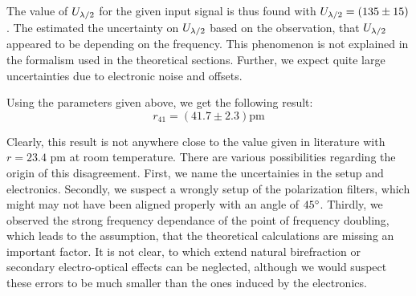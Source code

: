 The value of $U_{\lambda/2}$ for the given input signal is thus 
found with $U_{\lambda/2} = (135  \pm 15)$. 
The estimated the uncertainty on $U_{\lambda/2}$ based on the 
observation, that $U_{\lambda/2}$ appeared to be 
depending on the frequency. This phenomenon is not 
explained in the formalism used in the theoretical sections. 
Further, we expect quite large uncertainties due to 
electronic noise and offsets. 

Using the parameters given above, we get the following result: 
\begin{equation*}
r_{41} = \left (41.7 \pm 2.3 \right )  \mathrm{pm}
\end{equation*}

Clearly, this result is not anywhere close to the value given in 
literature with $r = 23.4$ pm at room temperature. There are 
various possibilities regarding the origin of this disagreement. 
First, we name the uncertainies in the setup and electronics. 
Secondly, we suspect a wrongly setup of the polarization filters, 
which might may not have been aligned properly with an 
angle of $45^\circ$. Thirdly, we observed the strong frequency dependance of 
the point of frequency doubling, which leads to the assumption, that 
the theoretical calculations are missing an important factor. 
It is not clear, to which extend natural birefraction or 
secondary electro-optical effects can be neglected, although 
we would suspect these errors to be much smaller than the ones 
induced by the electronics. 


